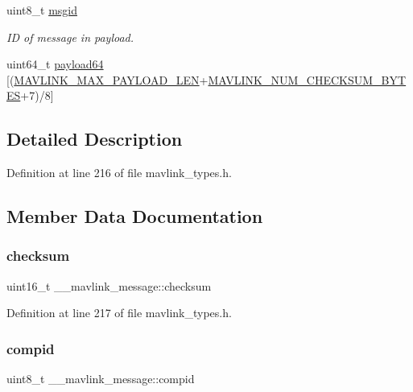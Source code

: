 \begin{DoxyCompactItemize}
uint8\+\_\+t \mbox{\hyperlink{struct____mavlink__message_a8d95b61c61b9086bada158104828d593}{msgid}}
\begin{DoxyCompactList}\small\item\em ID of message in payload. \end{DoxyCompactList}\item 
uint64\+\_\+t \mbox{\hyperlink{struct____mavlink__message_a267401209e74271b7ded879bb0f44e73}{payload64}} \mbox{[}(\mbox{\hyperlink{testmav_8c_acdb4be921d71a2d1c5b63467c58bd08e}{M\+A\+V\+L\+I\+N\+K\+\_\+\+M\+A\+X\+\_\+\+P\+A\+Y\+L\+O\+A\+D\+\_\+\+L\+EN}}+\mbox{\hyperlink{include__v2_80_2mavlink__types_8h_a0c5e0f95542a7073907027c431fa9351}{M\+A\+V\+L\+I\+N\+K\+\_\+\+N\+U\+M\+\_\+\+C\+H\+E\+C\+K\+S\+U\+M\+\_\+\+B\+Y\+T\+ES}}+7)/8\mbox{]}
\end{DoxyCompactItemize}


\subsection{Detailed Description}


Definition at line 216 of file mavlink\+\_\+types.\+h.



\subsection{Member Data Documentation}
\mbox{\label{struct____mavlink__message_a8c200d7751471b5ac54d090ba279a5a6}} 
\subsubsection{\texorpdfstring{checksum}{checksum}}
{\footnotesize\ttfamily uint16\+\_\+t \+\_\+\+\_\+mavlink\+\_\+message\+::checksum}



Definition at line 217 of file mavlink\+\_\+types.\+h.

\mbox{\label{struct____mavlink__message_a83ed773c359ffe4a8d0746f82af2b44d}} 
\subsubsection{\texorpdfstring{compid}{compid}}
{\footnotesize\ttfamily uint8\+\_\+t \+\_\+\+\_\+mavlink\+\_\+message\+::compid}



